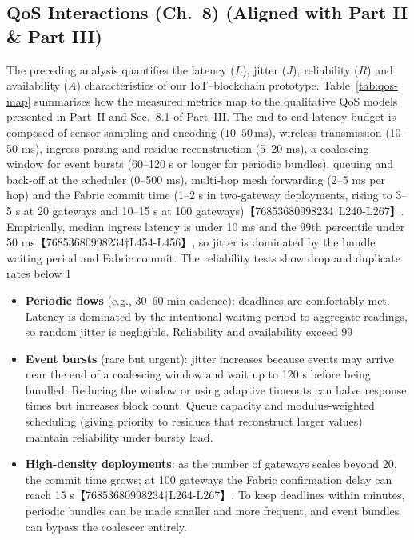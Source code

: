 \subsection{QoS Interactions (Ch.~8) (Aligned with Part II \& Part III)}
\label{subsec:qos-interactions}

The preceding analysis quantifies the latency (\(L\)), jitter (\(J\)), reliability (\(R\)) and availability (\(A\)) characteristics of our IoT–blockchain prototype.  Table~\ref{tab:qos-map} summarises how the measured metrics map to the qualitative QoS models presented in Part~II and Sec.~8.1 of Part~III.  The end‑to‑end latency budget is composed of sensor sampling and encoding (\(10\)–\(50\,\text{ms}\)), wireless transmission (10–50 ms), ingress parsing and residue reconstruction (5–20 ms), a coalescing window for event bursts (60–120 s or longer for periodic bundles), queuing and back‑off at the scheduler (0–500 ms), multi‑hop mesh forwarding (2–5 ms per hop) and the Fabric commit time (1–2 s in two‑gateway deployments, rising to 3–5 s at 20 gateways and 10–15 s at 100 gateways)【76853680998234†L240-L267】.  Empirically, median ingress latency is under 10 ms and the \(99\)th percentile under 50 ms【76853680998234†L454-L456】, so jitter is dominated by the bundle waiting period and Fabric commit.  The reliability tests show drop and duplicate rates below 1 %
\begin{itemize}
  \item \textbf{Periodic flows} (e.g., 30–60 min cadence): deadlines are comfortably met.  Latency is dominated by the intentional waiting period to aggregate readings, so random jitter is negligible.  Reliability and availability exceed 99 %
  \item \textbf{Event bursts} (rare but urgent): jitter increases because events may arrive near the end of a coalescing window and wait up to 120 s before being bundled.  Reducing the window or using adaptive timeouts can halve response times but increases block count.  Queue capacity and modulus‑weighted scheduling (giving priority to residues that reconstruct larger values) maintain reliability under bursty load.
  \item \textbf{High‑density deployments}: as the number of gateways scales beyond 20, the commit time grows; at 100 gateways the Fabric confirmation delay can reach 15 s【76853680998234†L264-L267】.  To keep deadlines within minutes, periodic bundles can be made smaller and more frequent, and event bundles can bypass the coalescer entirely.
\end{itemize}

